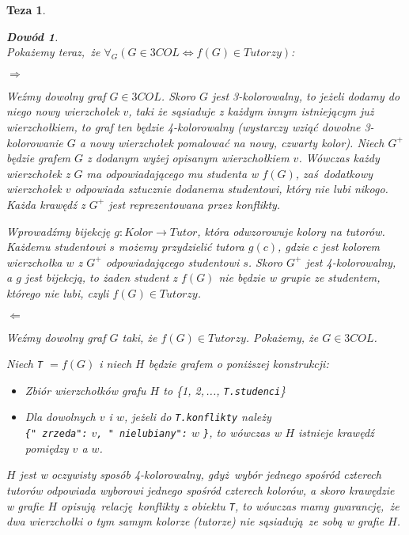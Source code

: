 \documentclass[12pt]{article}
\newtheorem*{theorem*}{Teza}
\newtheorem*{proof*}{Dowód}
\begin{document}
\begin{titlepage}
\begin{theorem*}
\begin{proof*}
$ $\\
Pokażemy teraz, że $\forall_G(G \in 3COL \Leftrightarrow f(G) \in Tutorzy)$:

$ $\\
$\Rightarrow$ 

Weźmy dowolny graf $G \in 3COL$. Skoro $G$ jest 3-kolorowalny, to jeżeli dodamy 
do niego nowy wierzchołek $v$, taki że sąsiaduje z każdym innym 
istniejącym już wierzchołkiem, to graf ten będzie 4-kolorowalny (wystarczy 
wziąć dowolne 3-kolorowanie $G$ a nowy wierzchołek pomalować na nowy, czwarty 
kolor). Niech $G^+$ będzie grafem $G$ z dodanym wyżej opisanym wierzchołkiem $v$.
Wówczas każdy wierzchołek z $G$ ma odpowiadającego mu studenta w $f(G)$, 
zaś dodatkowy wierzchołek $v$ odpowiada sztucznie dodanemu studentowi, który 
nie lubi nikogo. Każda krawędź z $G^+$ jest reprezentowana przez 
\textit{konflikty}. 

Wprowadźmy bijekcję $g : Kolor \rightarrow Tutor$, która odwzorowuje kolory na tutorów.
Każdemu studentowi $s$ możemy przydzielić tutora $g(c)$, gdzie $c$ jest 
kolorem wierzchołka $w$ z $G^+$ odpowiadającego studentowi $s$. Skoro $G^+$ 
jest 4-kolorowalny, a $g$ jest bijekcją, to żaden student z $f(G)$ nie będzie w grupie ze studentem, którego nie lubi, czyli $f(G) \in Tutorzy$.

$ $\\
$\Leftarrow$

Weźmy dowolny graf $G$ taki, że $f(G) \in Tutorzy$. Pokażemy, że $G \in 3COL$.


Niech \texttt{T} $= f(G)$ i niech $H$ będzie grafem o poniższej konstrukcji:
\begin{itemize}
    \item Zbiór wierzchołków grafu $H$ to \{1, 2,\,..., \texttt{T.studenci}\}
    \item Dla dowolnych $v$ i $w$, jeżeli do \texttt{T.konflikty} należy \\
        \texttt{\{"\hskip0pt zrzeda":} $v$\texttt{, "\hskip0pt nielubiany":} 
        $w$ \texttt{\}}, to wówczas w $H$ istnieje krawędź pomiędzy $v$ a $w$.
\end{itemize}

$H$ jest w oczywisty sposób 4-kolorowalny, gdyż wybór jednego spośród czterech 
tutorów odpowiada wyborowi jednego spośród czterech kolorów, a skoro krawędzie 
w grafie $H$ opisują relację \textit{konflikty} z obiektu \texttt{T}, to 
wówczas mamy gwarancję, że dwa wierzchołki o tym samym kolorze (tutorze) nie 
sąsiadują ze sobą w grafie $H$.


\end{proof*}
\end{theorem*}
\end{titlepage}
\end{document}
